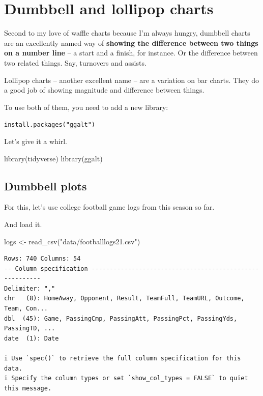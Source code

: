 \documentclass[
  letterpaper,
  DIV=11,
  numbers=noendperiod]{scrreprt}
\newenvironment{Shaded}{\begin{snugshade}}{\end{snugshade}}
\newcommand{\FunctionTok}[1]{\textcolor[rgb]{0.28,0.35,0.67}{#1}}
\newcommand{\NormalTok}[1]{\textcolor[rgb]{0.00,0.23,0.31}{#1}}
\newcommand{\OtherTok}[1]{\textcolor[rgb]{0.00,0.23,0.31}{#1}}
\newcommand{\StringTok}[1]{\textcolor[rgb]{0.13,0.47,0.30}{#1}}
\begin{document}

\hypertarget{dumbbell-and-lollipop-charts}{%
\chapter{Dumbbell and lollipop
charts}\label{dumbbell-and-lollipop-charts}}

Second to my love of waffle charts because I'm always hungry, dumbbell
charts are an excellently named way of \textbf{showing the difference
between two things on a number line} -- a start and a finish, for
instance. Or the difference between two related things. Say, turnovers
and assists.

Lollipop charts -- another excellent name -- are a variation on bar
charts. They do a good job of showing magnitude and difference between
things.

To use both of them, you need to add a new library:

\texttt{install.packages("ggalt")}

Let's give it a whirl.

\begin{Shaded}
\begin{Highlighting}[]
\FunctionTok{library}\NormalTok{(tidyverse)}
\FunctionTok{library}\NormalTok{(ggalt)}
\end{Highlighting}
\end{Shaded}

\hypertarget{dumbbell-plots}{%
\section{Dumbbell plots}\label{dumbbell-plots}}

For this, let's use college football game logs from this season so far.

And load it.

\begin{Shaded}
\begin{Highlighting}[]
\NormalTok{logs }\OtherTok{\textless{}{-}} \FunctionTok{read\_csv}\NormalTok{(}\StringTok{"data/footballlogs21.csv"}\NormalTok{)}
\end{Highlighting}
\end{Shaded}

\begin{verbatim}
Rows: 740 Columns: 54
-- Column specification --------------------------------------------------------
Delimiter: ","
chr   (8): HomeAway, Opponent, Result, TeamFull, TeamURL, Outcome, Team, Con...
dbl  (45): Game, PassingCmp, PassingAtt, PassingPct, PassingYds, PassingTD, ...
date  (1): Date

i Use `spec()` to retrieve the full column specification for this data.
i Specify the column types or set `show_col_types = FALSE` to quiet this message.
\end{verbatim}
\end{document}
